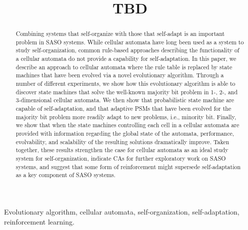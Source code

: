 \documentclass[10pt, conference, compsocconf]{IEEEtran}
\begin{document}
\sloppy

\title{TBD}

\author{
}
\maketitle

\begin{abstract}
Combining systems that self-organize with those that self-adapt is an important problem in SASO systems.  While cellular automata have long been used as a system to study self-organization, common rule-based approaches describing the functionality of a cellular automata do not provide a capability for self-adaptation.
%
In this paper, we describe an approach to cellular automata where the rule table is replaced by state machines that have been evolved via a novel evolutionary algorithm.  Through a number of different experiments, we show how this evolutionary algorithm is able to discover state machines that solve the well-known majority bit problem in 1-, 2-, and 3-dimensional cellular automata.
%
We then show that probabilistic state machine are capable of self-adaptation, and that adaptive PSMs that have been evolved for the majority bit problem more readily adapt to new problems, i.e., minority bit.
%
Finally, we show that when the state machines controlling each cell in a cellular automata are provided with information regarding the global state of the automata, performance, evolvability, and scalability of the resulting solutions dramatically improve.
%
Taken together, these results strengthen the case for cellular automata as an ideal study system for self-organization, indicate CAs for further exploratory work on SASO systems, and suggest that some form of reinforcement might supersede self-adaptation as a key component of SASO systems.
\end{abstract}

\begin{IEEEkeywords}
Evolutionary algorithm, cellular automata, self-organization, self-adaptation, reinforcement learning.
\end{IEEEkeywords}





\end{document}
